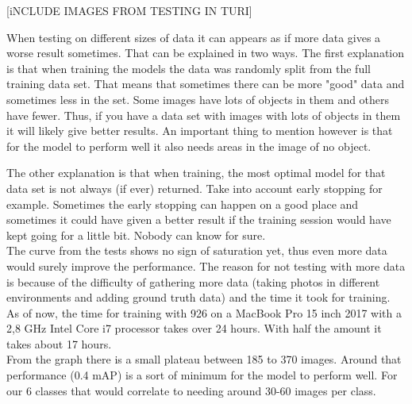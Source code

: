 [iNCLUDE IMAGES FROM TESTING  IN TURI]

When testing on different sizes of data it can appears as if more data gives a worse
result sometimes. That can be explained in two ways. The first explanation is that when
training the models the data was randomly split from the full training data set. That 
means that sometimes there can be more "good" data and sometimes less in the set.
Some images have lots of objects in them and others have fewer. Thus, if you have a
data set with images with lots of objects in them it will likely give better results.
An important thing to mention however is that for the model to perform well it also needs
areas in the image of no object.

The other explanation is that when training, the most optimal model for that data set is
not always (if ever) returned. Take into account early stopping for example.
Sometimes the early stopping can happen on a good place and sometimes it could have
given a better result if the training session would have kept going for a little bit.
Nobody can know for sure. \\

The curve from the tests shows no sign of saturation yet, thus even more data would
surely improve the performance. The reason for not testing with more data is because
of the difficulty of gathering more data (taking photos in different environments and 
adding ground truth data) and the time it took for training.
As of now, the time for training with 926 on a MacBook Pro 15 inch 2017 with a 2,8 GHz
Intel Core i7 processor takes over 24 hours. With half the amount it takes about 17 hours.\\

From the graph there is a small plateau between 185 to 370 images. Around that
performance (0.4 mAP) is a sort of minimum for the model to perform well.
For our 6 classes that would correlate to needing around 30-60 images per class.

\newpage